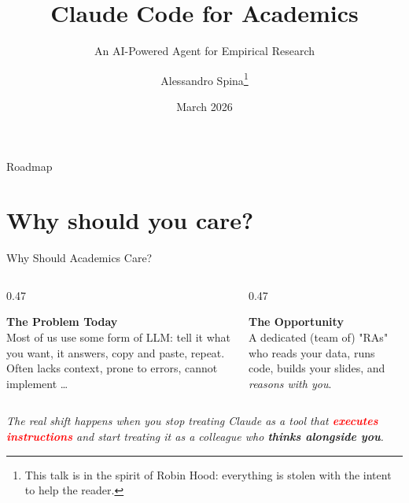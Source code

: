 \documentclass[aspectratio=169, 11pt]{beamer}
\title[Claude Code]{Claude Code for Academics}
\subtitle{An AI-Powered Agent for Empirical Research}
\author{Alessandro Spina\thanks{This talk is in the spirit of Robin Hood: everything is stolen with the intent to help the reader.}}
\institute{UTS Finance Department Brownbag}
\date{March 2026}
\newcommand{\emphgold}[1]{\alert{\textbf{#1}}}
\newcommand{\emphcoral}[1]{\textcolor{red}{\textbf{#1}}}
\begin{document}
\begin{frame}[plain]
\titlepage
\end{frame}

\begin{frame}{Roadmap}
\tableofcontents
\end{frame}

\section{Why should you care?}



\begin{frame}{Why Should Academics Care?}
\vspace{0.05cm}
\begin{columns}[T]
\begin{column}{0.47\textwidth}
  \begin{tcolorbox}[
    enhanced,
    colback=red!5,
    colframe=red!30,
    boxrule=0.5pt,
    sharp corners,
    left=8pt, right=8pt, top=2pt, bottom=6pt,
  ]
    {\large\bfseries\color{navy}The Problem Today}\\[8pt]
    Most of us use some form of LLM: tell it what you want, it answers, copy and paste, repeat. Often lacks context, prone to errors, cannot implement \ldots
  \end{tcolorbox}
\end{column}
\begin{column}{0.47\textwidth}
  \begin{tcolorbox}[
    enhanced,
    colback=green!5,
    colframe=green!30!black,
    boxrule=0.5pt,
    sharp corners,
    left=8pt, right=8pt, top=6pt, bottom=1pt,
  ]
    {\large\bfseries\color{navy}The Opportunity}\\[6pt]
    A dedicated (team of) "RAs" who reads your data, runs code, builds your slides, and \emph{reasons with you}.
  \end{tcolorbox}
\end{column}
\end{columns}

\vspace{0.05cm}
\begin{quotebox}
  \textit{The real shift happens when you stop treating Claude as a tool that \emphcoral{executes instructions} and start treating it as a colleague who \emphgold{thinks alongside you}.}
\end{quotebox}
\end{frame}
\end{document}
